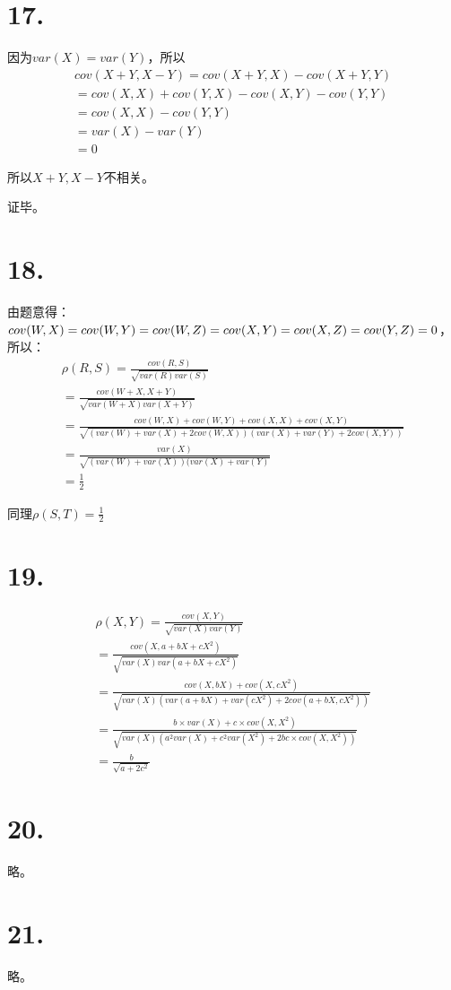\documentclass[UTF8]{report}
\begin{document}
    \section*{17.}
        因为$var(X) = var(Y)$，所以
        $$\begin{array}{l}
            cov(X + Y, X - Y) = cov(X + Y, X) - cov(X + Y, Y)\\
            = cov(X, X) + cov(Y, X) - cov(X, Y) - cov(Y, Y)\\
            = cov(X, X) - cov(Y, Y)\\
            = var(X) - var(Y)\\
            = 0
        \end{array}$$

        所以$X + Y, X - Y$不相关。

        证毕。
    \section*{18.}
        由题意得：
        $cov(W, X) = cov(W, Y) = cov(W, Z) = cov(X, Y) =\\ cov(X, Z) = cov(Y, Z) = 0$，
        所以：
        $$\begin{array}{l}
            \rho(R, S) = \frac{cov(R, S)}{\sqrt{var(R)var(S)}}\\
            = \frac{cov(W + X, X + Y)}{\sqrt{var(W + X)var(X + Y)}}\\
            = \frac{cov(W, X) + cov(W, Y) + cov(X, X) + cov(X, Y)}{\sqrt{(var(W) + var(X) + 2cov(W, X))(var(X) + var(Y) + 2cov(X, Y))}}\\
            = \frac{var(X)}{\sqrt{(var(W) + var(X))(var(X) + var(Y)}}\\
            = \frac{1}{2}
        \end{array}$$

        同理$\rho(S, T) = \frac{1}{2}$
    \section*{19.}
        $$\begin{array}{l}
            \rho(X, Y) = \frac{cov(X, Y)}{\sqrt{var(X)var(Y)}}\\
            = \frac{cov(X, a + bX + cX^2)}{\sqrt{var(X)var(a + bX + cX^2)}}\\
            = \frac{cov(X, bX) + cov(X, cX^2)}{\sqrt{var(X)(var(a + bX) + var(cX^2) +2cov(a + bX, cX^2))}}\\
            = \frac{b\times var(X) + c \times cov(X, X^2)}{\sqrt{var(X)(a^2var(X) + c^2var(X^2) + 2bc \times cov(X, X^2))}}\\
            = \frac{b}{\sqrt{a + 2c^2}}
        \end{array}$$
    \section*{20.}
        略。
    \section*{21.}
        略。
\end{document}
